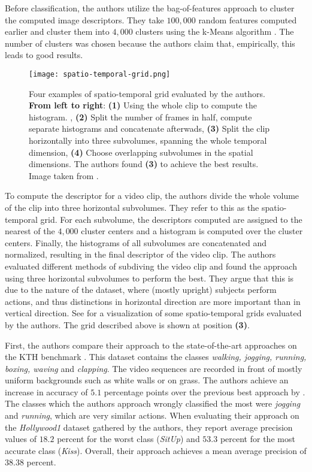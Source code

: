 Before classification, the authors utilize the bag-of-features approach to cluster the computed image descriptors.
They take $100,000$ random features computed earlier and cluster them into $4,000$ clusters using the k-Means algorithm \cite{macqueen_methods_1967}\cite{lloyd_least_1982}.
The number of clusters was chosen because the authors claim that, empirically, this leads to good results.

\begin{figure}[htb!]
    \centering
    \texttt{[image: spatio-temporal-grid.png]}
    \caption{Four examples of spatio-temporal grid evaluated by the authors. \textbf{From left to right}: \textbf{(1)} Using the whole clip to compute the histogram. , \textbf{(2)} Split the number of frames in half, compute separate histograms and concatenate afterwads, \textbf{(3)} Split the clip horizontally into three subvolumes, spanning the whole temporal dimension, \textbf{(4)} Choose overlapping subvolumes in the spatial dimensions. The authors found \textbf{(3)} to achieve the best results. Image taken from \cite{laptev_learning_2008}. }
    \label{fig:spatio-temporal-grid}
\end{figure}

To compute the descriptor for a video clip, the authors divide the whole volume of the clip into three horizontal subvolumes.
They refer to this as the spatio-temporal grid.
For each subvolume, the descriptors computed are assigned to the nearest of the $4,000$ cluster centers and a histogram is computed over the cluster centers.
Finally, the histograms of all subvolumes are concatenated and normalized, resulting in the final descriptor of the video clip.
The authors evaluated different methods of subdiving the video clip and found the approach using three horizontal subvolumes to perform the best.
They argue that this is due to the nature of the dataset, where (mostly upright) subjects perform actions, and thus distinctions in horizontal direction are more important than in vertical direction.
See  for a visualization of some spatio-temporal grids evaluated by the authors.
The grid described above is shown at position \textbf{(3)}.

First, the authors compare their approach to the state-of-the-art approaches on the KTH benchmark \cite{schuldt_recognizing_2004}.
This dataset contains the classes \textit{walking, jogging, running, boxing, waving} and \textit{clapping}.
The video sequences are recorded in front of mostly uniform backgrounds such as white walls or on grass.
The authors achieve an increase in accuracy of $5.1$ percentage points over the previous best approach by \cite{wong_extracting_2007}.
The classes which the authors approach wrongly classified the most were \textit{jogging} and \textit{running}, which are very similar actions.
When evaluating their approach on the \textit{Hollywood1} dataset gathered by the authors, they report average precision values of $18.2$ percent for the worst class (\textit{SitUp}) and $53.3$ percent for the most accurate class (\textit{Kiss}).
Overall, their approach achieves a mean average precision of $38.38$ percent.

